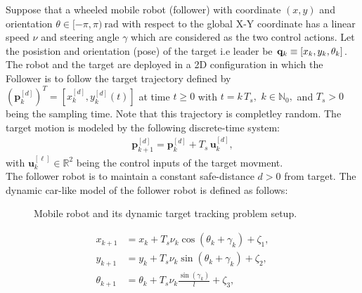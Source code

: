 \documentclass[conference]{IEEEtran}
\begin{document}
Suppose that a wheeled mobile robot (follower) with coordinate $(x,y)$ and orientation $\theta\in[-\pi,\pi)~\si{\radian}$ with respect to the global X-Y coordinate has a linear speed $\nu$ and steering angle $\gamma$ which are considered as the two control actions. Let the posistion and orientation (pose) of the target i.e leader be ${\bf q}_k\equiv[x_k,y_k,\theta_k]$. The robot and the target are deployed in a 2D configuration in which the Follower is to follow the target trajectory defined by  $(\mathbf{p}_k^{[d]})^T=[x_k^{[d]},y_k^{[d]}(t)]$ at time $t\ge 0$ with $t=k \, T_s,$ $k\in\mathbb{N}_0,$ and $T_s>0$ being the sampling time. Note that this trajectory is completley random. The target motion is modeled by the following discrete-time system:
 \begin{align}
   \label{eq:leaderDT}
   \mathbf{p}_{k+1}^{[d]} = \mathbf{p}_k^{[d]} + T_s \, \mathbf{u}_k^{[d]},
 \end{align}  
with $\mathbf{u}_k^{[\ell]}\in\mathbb{R}^2$ being the control inputs of the target movment. 
\\ The follower robot is to maintain a constant safe-distance $d>0$ from target. The dynamic car-like model of the follower robot is defined as follows:
  \begin{figure}
   \centering
   \caption{Mobile robot and its dynamic target tracking problem setup.}
   \label{fig:leaderFollowerSetup}
 \end{figure}
 \begin{subequations}
   \begin{align}
     x_{k+1}& =x_{k}+T_s\nu_{k}\cos{(\theta_{k}+\gamma_{k})} + \zeta_1,\\  
     y_{k+1}& =y_{k}+T_s\nu_{k}\sin{(\theta_{k}+\gamma_{k})}+ \zeta_2,\\
     \theta_{k+1}&=\theta_{k}+T_s\nu_{k}\frac{\sin{(\gamma_{k})}}{l}+ \zeta_3,
   \end{align}
 \label{eq:robotModel1-DT}
 \end{subequations}
 \\
\end{document}
